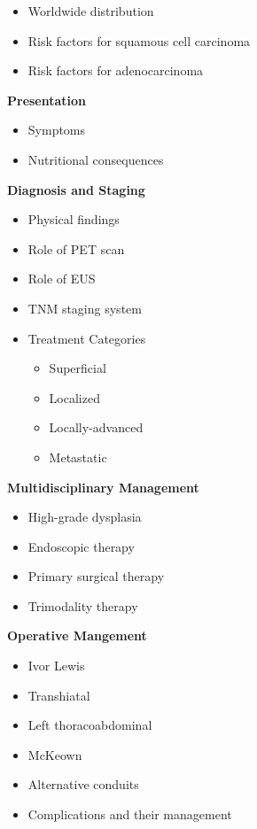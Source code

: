 \documentclass[
]{book}
\providecommand{\tightlist}{%
  \setlength{\itemsep}{0pt}\setlength{\parskip}{0pt}}
\begin{document}
\begin{itemize}
\tightlist
\item
  Worldwide distribution
\item
  Risk factors for squamous cell carcinoma
\item
  Risk factors for adenocarcinoma
\end{itemize}

\textbf{Presentation}

\begin{itemize}
\tightlist
\item
  Symptoms
\item
  Nutritional consequences
\end{itemize}

\textbf{Diagnosis and Staging}

\begin{itemize}
\tightlist
\item
  Physical findings
\item
  Role of PET scan
\item
  Role of EUS
\item
  TNM staging system
\item
  Treatment Categories

  \begin{itemize}
  \tightlist
  \item
    Superficial
  \item
    Localized
  \item
    Locally-advanced
  \item
    Metastatic
  \end{itemize}
\end{itemize}

\textbf{Multidisciplinary Management}

\begin{itemize}
\tightlist
\item
  High-grade dysplasia
\item
  Endoscopic therapy
\item
  Primary surgical therapy
\item
  Trimodality therapy
\end{itemize}

\textbf{Operative Mangement}

\begin{itemize}
\tightlist
\item
  Ivor Lewis
\item
  Transhiatal
\item
  Left thoracoabdominal
\item
  McKeown
\item
  Alternative conduits
\item
  Complications and their management
\end{itemize}
\end{document}
